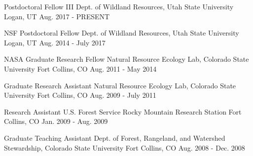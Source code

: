 

\begin{cventries}

  \eduentry
    {Postdoctoral Fellow III} %
    {Dept. of Wildland Resources, Utah State University} %
    {Logan, UT} %
    {Aug. 2017 - PRESENT} %

  \eduentry
    {NSF Postdoctoral Fellow} %
    {Dept. of Wildland Resources, Utah State University} %
    {Logan, UT} %
    {Aug. 2014 - July 2017} %

  \eduentry
    {NASA Graduate Research Fellow} %
    {Natural Resource Ecology Lab, Colorado State University} %
    {Fort Collins, CO} %
    {Aug. 2011 - May 2014} %

  \eduentry
    {Graduate Research Assistant} %
    {Natural Resource Ecology Lab, Colorado State University} %
    {Fort Collins, CO} %
    {Aug. 2009 - July 2011} %

  \eduentry
    {Research Assistant} %
    {U.S. Forest Service Rocky Mountain Research Station} %
    {Fort Collins, CO} %
    {Jan. 2009 - Aug. 2009} %

  \eduentry
    {Graduate Teaching Assistant} %
    {Dept. of Forest, Rangeland, and Watershed Stewardship, Colorado State University} %
    {Fort Collins, CO} %
    {Aug. 2008 - Dec. 2008} %

\end{cventries}
